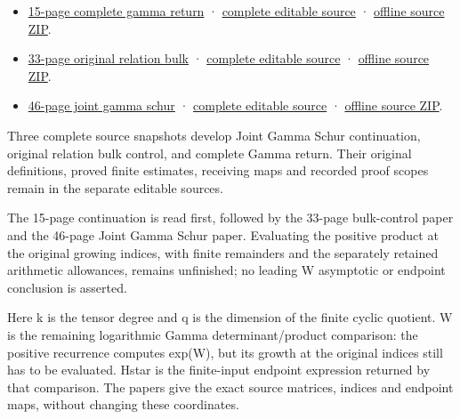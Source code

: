 \documentclass[
]{article}
\providecommand{\tightlist}{%
  \setlength{\itemsep}{0pt}\setlength{\parskip}{0pt}}
\begin{document}
\begin{itemize}
\tightlist
\item
  \href{https://zenodo.org/api/records/22754516/files/47-complete-gamma-return-reader.pdf/content}{15-page
  complete gamma return} ·
  \href{https://github.com/KokunoYumeto/zeta-function-research-reader/tree/01fc8820e3a3ea69afa22b8ab1b0b5ca61869456/workbenches/splitzero-tandem/continuations/20260914-complete-gamma-return}{complete
  editable source} ·
  \href{https://zenodo.org/api/records/22754516/files/48-complete-gamma-return-public-sources.zip/content}{offline
  source ZIP}.
\item
  \href{https://zenodo.org/api/records/22754516/files/45-original-relation-bulk-reader.pdf/content}{33-page
  original relation bulk} ·
  \href{https://github.com/KokunoYumeto/zeta-function-research-reader/tree/01fc8820e3a3ea69afa22b8ab1b0b5ca61869456/workbenches/splitzero-tandem/continuations/20260914-original-relation-bulk}{complete
  editable source} ·
  \href{https://zenodo.org/api/records/22754516/files/46-original-relation-bulk-public-sources.zip/content}{offline
  source ZIP}.
\item
  \href{https://zenodo.org/api/records/22754516/files/43-joint-gamma-schur-reader.pdf/content}{46-page
  joint gamma schur} ·
  \href{https://github.com/KokunoYumeto/zeta-function-research-reader/tree/2be3b23974bf040f4ea06240b8a4b85372f7c71d/workbenches/splitzero-tandem/continuations/20260914-joint-gamma-schur}{complete
  editable source} ·
  \href{https://zenodo.org/api/records/22754516/files/44-joint-gamma-schur-public-sources.zip/content}{offline
  source ZIP}.
\end{itemize}

Three complete source snapshots develop Joint Gamma Schur continuation,
original relation bulk control, and complete Gamma return. Their
original definitions, proved finite estimates, receiving maps and
recorded proof scopes remain in the separate editable sources.

The 15-page continuation is read first, followed by the 33-page
bulk-control paper and the 46-page Joint Gamma Schur paper. Evaluating
the positive product at the original growing indices, with finite
remainders and the separately retained arithmetic allowances, remains
unfinished; no leading W asymptotic or endpoint conclusion is asserted.

Here k is the tensor degree and q is the dimension of the finite cyclic
quotient. W is the remaining logarithmic Gamma determinant/product
comparison: the positive recurrence computes exp(W), but its growth at
the original indices still has to be evaluated. Hstar is the
finite-input endpoint expression returned by that comparison. The papers
give the exact source matrices, indices and endpoint maps, without
changing these coordinates.
\end{document}

